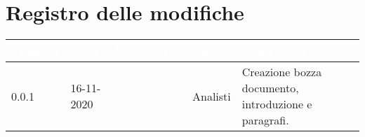 \section*{Registro delle modifiche}
{
\renewcommand{\arraystretch}{1.5}
\centering
\begin{longtable}{C{1.7cm} C{2.5cm} C{3.2cm} C{2.7cm} C{4.8cm}}
\textcolor{white}{\textbf{Versione}}&
\textcolor{white}{\textbf{Data}}&
\textcolor{white}{\textbf{Nominativo}}&
\textcolor{white}{\textbf{Ruolo}}&
\textcolor{white}{\textbf{Descrizione}}\\	
\endhead

0.0.1 & 16-11-2020 & \Gruppo{} & Analisti & Creazione bozza documento, introduzione e paragrafi. \\	
\end{longtable}
}

